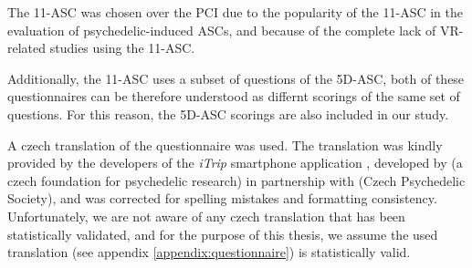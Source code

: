 The \ac{11-ASC} was chosen over the \ac{PCI} due to the popularity of the \ac{11-ASC} in the evaluation of psychedelic-induced \acp{ASC}, and because of the complete lack of \ac{VR}-related studies using the \ac{11-ASC}.

Additionally, the \ac{11-ASC} uses a subset of questions of the \ac{5D-ASC}, both of these questionnaires can be therefore understood as differnt scorings of the same set of questions. For this reason, the \ac{5D-ASC} scorings are also included in our study.

A czech translation of the questionnaire was used. The translation was kindly provided by the developers of the \textit{iTrip} smartphone application \autocite{nimh2020itrip}, developed by  (a czech foundation for psychedelic research) in partnership with  (Czech Psychedelic Society), and was corrected for spelling mistakes and formatting consistency. Unfortunately, we are not aware of any czech translation that has been statistically validated, and for the purpose of this thesis, we assume the used translation (see appendix \ref{appendix:questionnaire}) is statistically valid.
